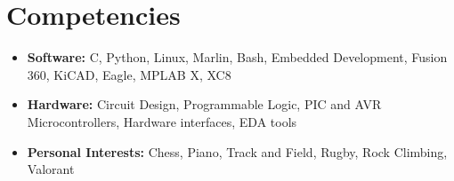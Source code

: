 \documentclass[
	12pt, %
]{FreemanCV}
\begin{document}
\section{Competencies}
\begin{itemize}[leftmargin=10pt]
	\itemsep-5pt
	\item \textbf{Software:} C, Python, Linux, Marlin, Bash, Embedded Development, Fusion 360, KiCAD, Eagle, MPLAB X, XC8
	\item \textbf{Hardware:} Circuit Design, Programmable Logic, PIC and AVR Microcontrollers, Hardware interfaces, EDA tools
	\item \textbf{Personal Interests:} Chess, Piano, Track and Field, Rugby, Rock Climbing, Valorant
\end{itemize}

\vfill
\vspace{1cm}
\end{document}
